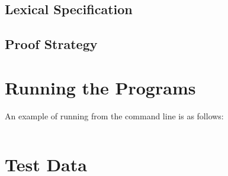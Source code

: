 \documentclass{l4proj}
\begin{document}
\section{Lexical Specification}

\section{Proof Strategy}


\begin{appendices}

\chapter{Running the Programs}
An example of running from the command line is as follows:
\begin{verbatim}
\end{verbatim}

\chapter{Test Data}

\end{appendices}




\end{document}
